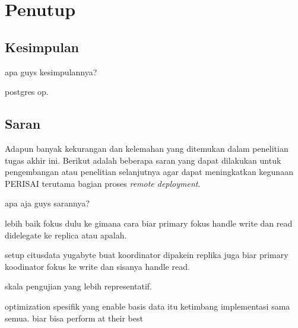 \chapter{Penutup}

\section{Kesimpulan}

apa guys kesimpulannya?

postgres op.



\section{Saran}
Adapun banyak kekurangan dan kelemahan yang ditemukan dalam penelitian tugas akhir ini. Berikut adalah beberapa saran yang dapat dilakukan untuk pengembangan atau penelitian selanjutnya agar dapat meningkatkan kegunaan PERISAI terutama bagian proses \textit{remote deployment}.

apa aja guys sarannya?

lebih baik fokus dulu ke gimana cara biar primary fokus handle write dan read didelegate ke replica atau apalah.

setup citusdata yugabyte buat koordinator dipakein replika juga biar primary koodinator fokus ke write dan sisanya handle read.

skala pengujian yang lebih representatif.

optimization spesifik yang enable basis data itu ketimbang implementasi sama semua. biar bisa perform at their best